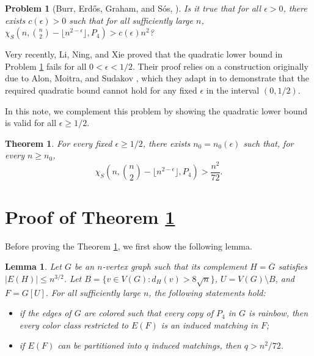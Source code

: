 \documentclass[11pt,a4paper]{article}
\newtheorem{theorem}{Theorem}
\newtheorem{lemma}{Lemma}
\newtheorem{problem}{Problem}
\newcommand{\chiS}{\chi_S}
\begin{document}
\begin{problem}[Burr, Erd\H{o}s, Graham, and S\'{o}s, \cite{Bur2}]
\label{prob:1.3}
Is it true that for all $\epsilon > 0$, there exists $c(\epsilon) > 0$ such that for all sufficiently large $n$, $\chi_S\left(n, \binom{n}{2} - \lfloor n^{2-\epsilon} \rfloor, P_4\right) > c(\epsilon)n^2$?
\end{problem}


Very recently, Li, Ning, and Xie \cite{Li} proved that the quadratic lower bound in Problem \ref{prob:1.3} fails for all  \(0<\epsilon <1/2\). Their proof relies on a construction originally due to Alon, Moitra, and Sudakov \cite{Alo}, which they adapt in \cite{Li} to demonstrate that the required quadratic bound cannot hold for any fixed \(\epsilon\) in the interval \((0,1/2)\).

In this note, we complement this problem by showing the quadratic lower bound is valid for all \(\epsilon \ge 1/2\).

\begin{theorem}\label{thm:main}
For every fixed $\epsilon\ge 1/2$, there exists $n_0=n_0(\epsilon)$ such that,
for every $n\ge n_0$,
\[
\chiS\left(n,\binom{n}{2}-\lfloor n^{2-\epsilon}\rfloor,P_4\right)>
\frac{n^2}{72}.
\]
\end{theorem}








\section{Proof of Theorem \ref{thm:main}}


Before proving the Theorem \ref{thm:main}, we first show the following lemma.


\begin{lemma}\label{lem:dense-core}
Let $G$ be an $n$-vertex graph such that its complement $H=\overline G$ satisfies $|E(H)|\le n^{3/2}$.  
Let $B=\{v\in V(G): d_H(v)>8\sqrt n\}$, $U=V(G)\setminus B$, and  $F=G[U].$
For all sufficiently large $n$, the following statements hold:
\begin{itemize}
\item [\rm{(i)}]  if the edges of $G$ are colored such that every copy of $P_4$ in $G$ is rainbow, then every color class restricted to $E(F)$ is an induced matching in $F$;
\item [\rm{(ii)}]  if $E(F)$ can be partitioned into $q$ induced matchings,  then $q> n^2/72$.
\end{itemize}
\end{lemma}
\end{document}
